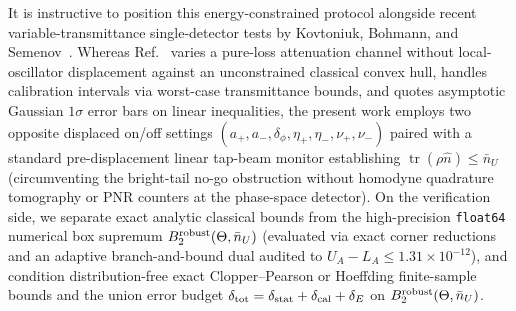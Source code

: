 \documentclass{iopjournal}
\newcommand{\tr}{\operatorname{tr}}
\newcommand{\nU}{\bar n_U}
\begin{document}
It is instructive to position this energy-constrained protocol alongside recent variable-transmittance single-detector tests by Kovtoniuk, Bohmann, and Semenov~\cite{Kovtoniuk2026}. Whereas Ref.~\cite{Kovtoniuk2026} varies a pure-loss attenuation channel without local-oscillator displacement against an unconstrained classical convex hull, handles calibration intervals via worst-case transmittance bounds, and quotes asymptotic Gaussian $1\sigma$ error bars on linear inequalities, the present work employs two opposite displaced on/off settings $(a_+, a_-, \delta_\phi, \eta_+, \eta_-, \nu_+, \nu_-)$ paired with a standard pre-displacement linear tap-beam monitor establishing $\tr(\rho\hat n) \le \nU$ (circumventing the bright-tail no-go obstruction without homodyne quadrature tomography or PNR counters at the phase-space detector). On the verification side, we separate exact analytic classical bounds from the high-precision \texttt{float64} numerical box supremum $B_2^{\rm robust}(\Theta,\nU)$ (evaluated via exact corner reductions and an adaptive branch-and-bound dual audited to $U_A - L_A \le 1.31 \times 10^{-12}$), and condition distribution-free exact Clopper--Pearson or Hoeffding finite-sample bounds and the union error budget $\delta_{\rm tot} = \delta_{\rm stat}+\delta_{\rm cal}+\delta_E$ on $B_2^{\rm robust}(\Theta,\nU)$.
\end{document}
